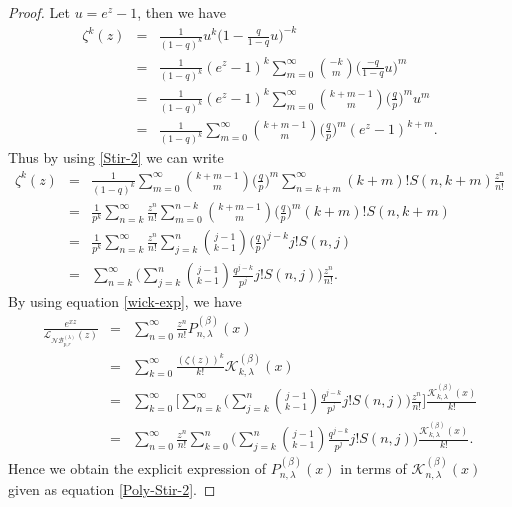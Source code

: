 \documentclass{birkjour}
\theoremstyle{definition}
\theoremstyle{remark}
\numberwithin{equation}{section}
\begin{document}
\begin{proof}
Let $u=e^{z}-1$, then we have
$$\begin{array}{lll}
\zeta^{k}(z)&=&\displaystyle{\frac{1}{(1-q)^{k}}u^{k}\Big(1-\frac{q}{1-q}u\Big)^{-k}}\\
&=&\displaystyle{\frac{1}{(1-q)^{k}}(e^{z}-1)^{k}\sum^{\infty}_{m=0}\binom{-k}{m}\Big(\frac{-q}{1-q}u\Big)^{m}}\\
&=&\displaystyle{\frac{1}{(1-q)^{k}}(e^{z}-1)^{k}\sum^{\infty}_{m=0}\binom{k+m-1}{m}\big(\frac{q}{p}\big)^{m}u^{m}}\\
&=&\displaystyle{\frac{1}{(1-q)^{k}}\sum^{\infty}_{m=0}\binom{k+m-1}{m}\big(\frac{q}{p}\big)^{m}(e^{z}-1)^{k+m}}.
\end{array}$$
Thus by using \eqref{Stir-2} we can write
$$\begin{array}{lll}
\zeta^{k}(z)&=&\displaystyle{\frac{1}{(1-q)^{k}}\sum^{\infty}_{m=0}\binom{k+m-1}{m}\big(\frac{q}{p}\big)^{m}
\sum^{\infty}_{n=k+m}(k+m)!S(n,
k+m)\frac{z^{n}}{n!}}\\
&=&\displaystyle{\frac{1}{p^{k}}\sum^{\infty}_{n=k}\frac{z^{n}}{n!}\sum^{n-k}_{m=0}\binom{k+m-1}{m}\big(\frac{q}{p}\big)^{m}
(k+m)!S(n,k+m)}\\
&=&\displaystyle{\frac{1}{p^{k}}\sum^{\infty}_{n=k}\frac{z^{n}}{n!}\sum^{n}_{j=k}\binom{j-1}{k-1}\big(\frac{q}{p}\big)^{j-k}
j!S(n,j)}\\
&=&\displaystyle{\sum^{\infty}_{n=k}\Big(\sum^{n}_{j=k}\binom{j-1}{k-1}\frac{q^{j-k}}{p^{j}}
j!S(n,j)\Big)\frac{z^{n}}{n!}}.
\end{array}$$
By using equation \eqref{wick-exp}, we have
$$\begin{array}{lll}
\displaystyle{\frac{e^{xz}}{\mathcal{L}_{\mathcal{NB}^{(\lambda)}_{p,
r}}(z)}}&=&\displaystyle{\sum^{\infty}_{n=0}\frac{z^{n}}{n!}P^{(\beta)}_{n,
\lambda}(x)}\\
&=&\displaystyle{\sum^{\infty}_{k=0}\frac{(\zeta(z))^{k}}{k!}\mathcal{K}^{(\beta)}_{k, \lambda}(x)}\\
&=&\displaystyle{\sum^{\infty}_{k=0}\Big[\sum^{\infty}_{n=k}\Big(\sum^{n}_{j=k}\binom{j-1}{k-1}\frac{q^{j-k}}{p^{j}}
j!S(n,j)\Big)\frac{z^{n}}{n!}\Big]\frac{\mathcal{K}^{(\beta)}_{k,
\lambda}(x)}{k!}}
\\
&=&\displaystyle{\sum^{\infty}_{n=0}\frac{z^{n}}{n!}\sum^{n}_{k=0}\Big(\sum^{n}_{j=k}\binom{j-1}{k-1}\frac{q^{j-k}}{p^{j}}
j!S(n,j)\Big)\frac{\mathcal{K}^{(\beta)}_{k, \lambda}(x)}{k!}}.
\end{array}$$
Hence we obtain the explicit expression of $P^{(\beta)}_{n,
\lambda}(x)$ in terms of $\mathcal{K}^{(\beta)}_{n, \lambda}(x)$
given as equation \eqref{Poly-Stir-2}.
\end{proof}
\end{document}
